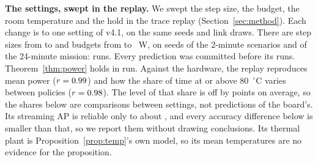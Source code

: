 \documentclass[conference]{IEEEtran}
\begin{document}
\textbf{The settings, swept in the replay.} We swept the step size, the budget, the room temperature and the hold in
the trace replay (Section~\ref{sec:method}). Each change is to one setting of v4.1, on the same seeds and link draws.
There are \TsEtaN{} step sizes from \TsEtaMin{} to \TsEtaMax{} and budgets from \TsBudMin{} to \TsBudMax~W, on
\TsShortSeeds{} seeds of the 2-minute scenarios and \TsLongSeeds{} of the 24-minute mission: \TsRuns{} runs. Every
prediction was committed before its runs. Theorem~\ref{thm:power} holds in \TsBoundAll{} run. Against the hardware, the
replay reproduces mean power ($r = 0.99$) and how the share of time at or above 80~$^\circ$C varies between
policies ($r = 0.98$). The level of that share is off by \ReplayHotMad{} points on average, so the shares below
are comparisons between settings, not predictions of the board's.
Its streaming AP is reliable only to about \ReplayLeafBias, and every accuracy difference below is smaller than that,
so we report them without drawing conclusions. Its thermal plant is Proposition~\ref{prop:temp}'s own model, so its
mean temperatures are no evidence for the proposition.
\end{document}
